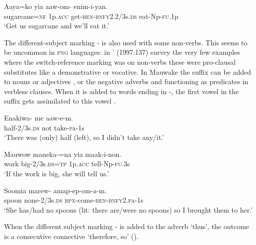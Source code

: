 \ea%
\label{ex:3:x695}
\gll Aaya=ko yia aaw-om- enim-i-yan. \\
sugarcane=\textsc{nf} 1p.\textsc{acc} get-\textsc{ben}-\textsc{bnfy}2.2/3s.\textsc{ds} eat-Np-\textsc{fu}.1p\\
\glt`Get us sugarcane and we'll eat it.'
\z

The different-subject marking \nobreakdash- is also used with some non-verbs. This seems to be uncommon in \textsc{png} languages: in \citeauthor{Roberts1997}' (1997:137) survey the very few examples where the switch-reference marking was on non-verbs these were pro-clausal substitutes like a demonstrative or vocative. In Mauwake the  suffix can be added to nouns  or adjectives , or the negative adverbs  and   functioning as predicates in verbless clauses. When it is added to words ending in -, the first vowel in the suffix gets assimilated to this vowel .

\ea%
\label{ex:3:x250}
\gll Enakiwa- me aaw-e-m. \\
half-2/3s.\textsc{ds} not take-\textsc{pa}-1s \\
\glt`There was (only) half (left), so I didn't take any/it.'
\z

\ea%
\label{ex:3:x251}
\gll Mauwow maneka-=na yia maak-i-non. \\
work big-2/3s.\textsc{ds}=\textsc{tp} 1p.\textsc{acc} tell-Np-\textsc{fu}.3s \\
\glt`If the work is big, she will tell us.'
\z

\ea%
\label{ex:3:x252}
\gll Soomia marew- amap-ep-om-a-m. \\
spoon none-2/3s.\textsc{ds} \textsc{bpx}-come-\textsc{ben}-\textsc{bnfy}2.\textsc{pa}-1s \\
\glt`She has/had no spoons (lit: there are/were no spoons) so I brought them to her.'
\z

When the different subject marking \nobreakdash- is added to the adverb  `thus', the outcome is a consecutive connective `therefore, so' ().

